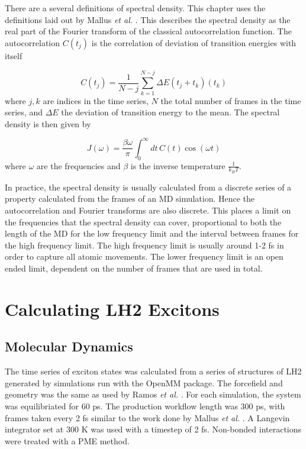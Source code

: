 There are a several definitions of spectral density. This chapter uses the definitions
laid out by Mallus \emph{et al.} \cite{Mallus2018}. This describes the spectral density
as the real part of the Fourier transform of the classical autocorrelation function.
The autocorrelation $C\left(t_j\right)$ is the correlation of deviation of transition
energies with itself

\begin{equation}
    C\left(t_j\right) = \frac{1}{N-j} \sum^{N-j}_{k=1} \Delta E \left(t_j + t_k\right) \left(t_k\right)
\end{equation}
%
where $j,k$ are indices in the time series, $N$ the total number of frames in the
time series, and $\Delta E$ the deviation of transition energy to the mean. The
spectral density is then given by

\begin{equation}
    J\left(\omega\right) = \frac{\beta \omega}{\pi} \int^\infty_0 dt \, C\left(t\right) \cos \left(\omega t\right)
\end{equation}
%
where $\omega$ are the frequencies and $\beta$ is the inverse temperature $\frac{1}{k_B T}$.

In practice, the spectral density is usually calculated from a discrete series of 
a property calculated from the frames of an MD simulation. Hence the autocorrelation
and Fourier transforms are also discrete. This places a limit on the frequencies 
that the spectral density can cover, proportional to both the length of the MD
for the low frequency limit and the interval between frames for the high frequency
limit. The high frequency limit is usually around 1-2 fs in order to capture all
atomic movements. The lower frequency limit is an open ended limit, dependent on
the number of frames that are used in total.

\section{Calculating LH2 Excitons}
\label{sec:MD}

\subsection{Molecular Dynamics}
\label{subsec:specdens_MD}

The time series of exciton states was calculated from a series of structures of 
LH2 generated by simulations run with the OpenMM package. The forcefield and geometry
was the same as used by Ramos \emph{et al.} \cite{Mennucci2019}. For each simulation,
the system was equilibriated for 60 ps. The production workflow length was 300 ps, 
with frames taken every 2 fs similar to the work done by Mallus \emph{et al.} \cite{Mallus2018}.
A Langevin integrator set at 300 K was used with a timestep of 2 fs. Non-bonded
interactions were treated with a PME method.

